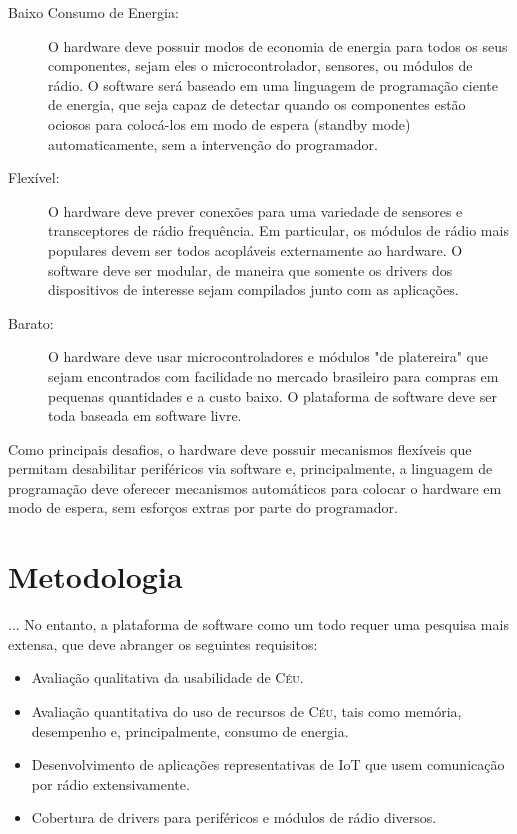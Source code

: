 \documentclass[titlepage,12pt]{article}
\newcommand{\CEU}{\textsc{C\'{e}u}\xspace}
\begin{document}
\begin{description}
%
\item[Baixo Consumo de Energia:]
  O hardware deve possuir modos de economia de energia para todos os seus
  componentes, sejam eles o microcontrolador, sensores, ou módulos de rádio.
  O software será baseado em uma linguagem de programação ciente de energia,
  que seja capaz de detectar quando os componentes estão ociosos para
  colocá-los em modo de espera (standby mode) automaticamente, sem a
  intervenção do programador.
%
\item[Flexível:]
  O hardware deve prever conexões para uma variedade de sensores e
  transceptores de rádio frequência.
  Em particular, os módulos de rádio mais populares devem ser todos acopláveis
  externamente ao hardware.
  O software deve ser modular, de maneira que somente os drivers dos
  dispositivos de interesse sejam compilados junto com as aplicações.
%
\item[Barato:]
  O hardware deve usar microcontroladores e módulos "de platereira" que sejam
  encontrados com facilidade no mercado brasileiro para compras em pequenas
  quantidades e a custo baixo.
  O plataforma de software deve ser toda baseada em software livre.
%
\end{description}

Como principais desafios, o hardware deve possuir mecanismos flexíveis que
permitam desabilitar periféricos via software e, principalmente, a linguagem de
programação deve oferecer mecanismos automáticos para colocar o hardware em
modo de espera, sem esforços extras por parte do programador.

\begin{comment}
O enfoque principal se dá no baixo consumo de energia, mas a flexibilidade e
baixo custo são fundamentais para promover uma maior adoção da plataforma,
principalmente no contexto de pesquisa em IoT.
\end{comment}


\section{Metodologia}

...
%
No entanto, a plataforma de software como um todo requer uma pesquisa mais
extensa, que deve abranger os seguintes requisitos:
%
\begin{itemize}
\item Avaliação qualitativa da usabilidade de \CEU.
\item Avaliação quantitativa do uso de recursos de \CEU, tais como memória,
      desempenho e, principalmente, consumo de energia.
\item Desenvolvimento de aplicações representativas de IoT que usem comunicação
      por rádio extensivamente.
\item Cobertura de drivers para periféricos e módulos de rádio diversos.
\end{itemize}
\end{document}
